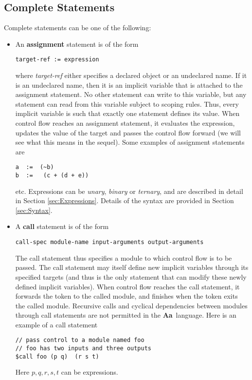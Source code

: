 \documentclass{article}
\newcommand{\Aa}{{\bf Aa}~}
\begin{document}
\subsection{Complete Statements}

Complete statements can be one of the following:
\begin{itemize}
\item An {\bf assignment} statement is of the form
\begin{verbatim}
target-ref := expression
\end{verbatim}
where {\em target-ref} either specifies a declared object
or an undeclared name.  If it is an undeclared name, then
it is an implicit variable that is attached to the
assignment statement.  No other statement can write to this
variable, but any statement can read from this variable
subject to scoping rules.  Thus, every implicit variable
is such that exactly one statement defines its value.
When control flow reaches an assignment statement, it
evaluates the expression, updates the value of the target
and passes the control flow forward (we will see what this
means in the sequel).
Some examples of assignment statements are 
\begin{verbatim}
a  :=  (~b)
b  :=   (c + (d + e))
\end{verbatim}
etc.   Expressions can be {\em unary},
{\em binary} or {\em ternary}, and are
described in detail in Section \ref{sec:Expressions}.
Details of the syntax are provided in 
Section \ref{sec:Syntax}.
\item A {\bf call} statement is of the form
\begin{verbatim}
call-spec module-name input-arguments output-arguments
\end{verbatim}
The call statement thus specifies a module to which control flow
is to be passed.  The call statement may itself define new implicit
variables through its specified targets (and thus is the only
statement that can modify these newly defined implicit variables).
When control flow reaches the call statement, it forwards the
token to the called module, and finishes when the token exits
the called module.  Recursive calls and cyclical dependencies between
modules through call statements are not permitted in the \Aa language.
Here is an example of a call statement
\begin{verbatim}
// pass control to a module named foo
// foo has two inputs and three outputs
$call foo (p q)  (r s t)
\end{verbatim}
Here $p,q,r,s,t$ can be expressions.


\end{itemize}
\end{document}
